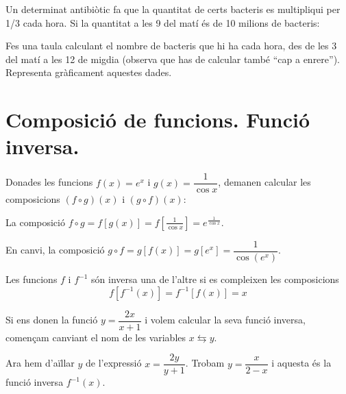 \begin{mylist}
\exer  Un determinat antibiòtic fa que la quantitat de certs bacteris es multipliqui per 1/3 cada hora. Si la quantitat a les 9 del matí és de 10 milions de bacteris: 
 
 \begin{tasks}
\task Fes una taula calculant el nombre de bacteris que hi ha cada hora, des de les 3 del matí a les 12 de migdia (observa que has de calcular també ``cap a enrere'').
%
\task Representa gràficament aquestes dades.
\end{tasks}

\end{mylist}

\section{Composició de funcions. Funció inversa.}

\begin{example}
Donades les funcions $f(x)=e^x$ i $g(x)=\dfrac{1}{\cos x}$, demanen calcular les composicions $(f\circ g)(x)$ i $(g\circ f)(x)$:
	
	La composició $f\circ g = f[g(x)]=f\left[\frac{1}{\cos x}\right]=e^{\frac{1}{\cos x}}$.
	
	En canvi, la composició  $g\circ f = g[f(x)]=g\left[e^x\right]=\dfrac{1}{\cos (e^x)}$.
\end{example}

\vspace{5cm}
\begin{theorybox}	
	Les funcions $f$ i $f^{-1}$ són inversa una de l'altre si es compleixen les composicions 
	\[ f[f^{-1}(x)]=f^{-1}[f(x)]=x \]
 
	Si ens donen la funció $y=\dfrac{2x}{x+1}$ i volem calcular la seva funció inversa, començam canviant el nom de les variables $x \leftrightarrows y$.
	
	Ara hem d'aïllar $y$ de l'expressió $x=\dfrac{2y}{y+1}$. Trobam $y=\dfrac{x}{2-x}$ i aquesta és la funció inversa $f^{-1}(x)$.
\end{theorybox}

